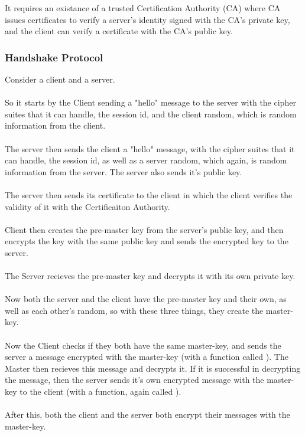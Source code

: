 \documentclass{article}
\begin{document}
It requires an existance of a trusted Certification Authority (CA) where CA issues certificates to verify a server's identity signed with the CA's private key, and the client can verify a certificate with the CA's public key.

\subsubsection{Handshake Protocol}

Consider a client and a server.
\\
\\
So it starts by the Client sending a "hello" message to the server with the cipher suites that it can handle, the session id, and the client random, which is random information from the client.
\\
\\
The server then sends the client a "hello" message, with the cipher suites that it can handle, the session id, as well as a server random, which again, is random information from the server. The server also sends it's public key.
\\
\\
The server then sends its certificate to the client in which the client verifies the validity of it with the Certificaiton Authority.
\\
\\
Client then creates the pre-master key from the server's public key, and then encrypts the key with the same public key and sends the encrypted key to the server.
\\
\\
The Server recieves the pre-master key and decrypts it with its own private key.
\\
\\
Now both the server and the client have the pre-master key and their own, as well as each other's random, so with these three things, they create the master-key.
\\
\\
Now the Client checks if they both have the same master-key, and sends the server a message encrypted with the master-key (with a function called ). The Master then recieves this message and decrypts it. If it is successful in decrypting the message, then the server sends it's own encrypted message with the master-key to the client (with a function, again called ).
\\
\\
After this, both the client and the server both encrypt their messages with the master-key.
\end{document}
